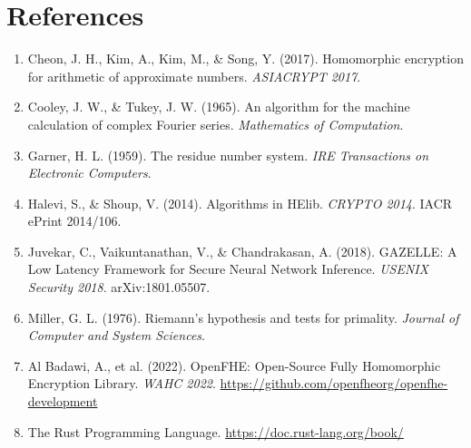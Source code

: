 \documentclass[11pt,a4paper]{article}
\begin{document}
\section{References}

\begin{enumerate}
    \item Cheon, J. H., Kim, A., Kim, M., \& Song, Y. (2017). Homomorphic encryption for arithmetic of approximate numbers. \textit{ASIACRYPT 2017}.
    
    \item Cooley, J. W., \& Tukey, J. W. (1965). An algorithm for the machine calculation of complex Fourier series. \textit{Mathematics of Computation}.
    
    \item Garner, H. L. (1959). The residue number system. \textit{IRE Transactions on Electronic Computers}.
    
    \item \label{halevi2014algorithms} Halevi, S., \& Shoup, V. (2014). Algorithms in HElib. \textit{CRYPTO 2014}. IACR ePrint 2014/106.
    
    \item \label{juvekar2018gazelle} Juvekar, C., Vaikuntanathan, V., \& Chandrakasan, A. (2018). GAZELLE: A Low Latency Framework for Secure Neural Network Inference. \textit{USENIX Security 2018}. arXiv:1801.05507.
    
    \item Miller, G. L. (1976). Riemann's hypothesis and tests for primality. \textit{Journal of Computer and System Sciences}.
    
    \item \label{openfhe} Al Badawi, A., et al. (2022). OpenFHE: Open-Source Fully Homomorphic Encryption Library. \textit{WAHC 2022}. \url{https://github.com/openfheorg/openfhe-development}
    
    \item The Rust Programming Language. \url{https://doc.rust-lang.org/book/}
\end{enumerate}
\end{document}

